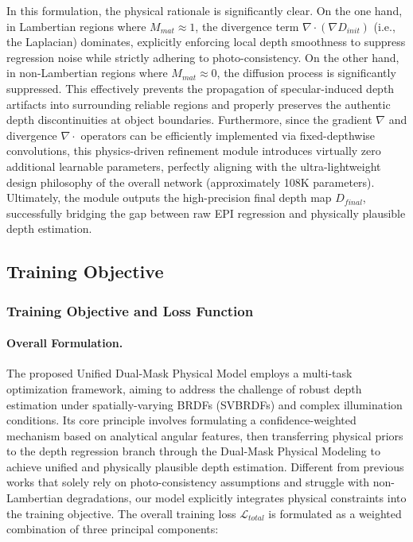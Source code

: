 In this formulation, the physical rationale is significantly clear. On the one hand, in Lambertian regions where $M_{mat} \approx 1$, the divergence term $\nabla \cdot (\nabla D_{init})$ (i.e., the Laplacian) dominates, explicitly enforcing local depth smoothness to suppress regression noise while strictly adhering to photo-consistency. On the other hand, in non-Lambertian regions where $M_{mat} \approx 0$, the diffusion process is significantly suppressed. This effectively prevents the propagation of specular-induced depth artifacts into surrounding reliable regions and properly preserves the authentic depth discontinuities at object boundaries. Furthermore, since the gradient $\nabla$ and divergence $\nabla \cdot$ operators can be efficiently implemented via fixed-depthwise convolutions, this physics-driven refinement module introduces virtually zero additional learnable parameters, perfectly aligning with the ultra-lightweight design philosophy of the overall network (approximately 108K parameters). Ultimately, the module outputs the high-precision final depth map $D_{final}$, successfully bridging the gap between raw EPI regression and physically plausible depth estimation.

\subsection{Training Objective}

\subsubsection{Training Objective and Loss Function}

\paragraph{Overall Formulation.}
The proposed Unified Dual-Mask Physical Model employs a multi-task optimization framework, aiming to address the challenge of robust depth estimation under spatially-varying BRDFs (SVBRDFs) and complex illumination conditions. Its core principle involves formulating a confidence-weighted mechanism based on analytical angular features, then transferring physical priors to the depth regression branch through the Dual-Mask Physical Modeling to achieve unified and physically plausible depth estimation. Different from previous works that solely rely on photo-consistency assumptions and struggle with non-Lambertian degradations, our model explicitly integrates physical constraints into the training objective. The overall training loss $\mathcal{L}_{total}$ is formulated as a weighted combination of three principal components:


